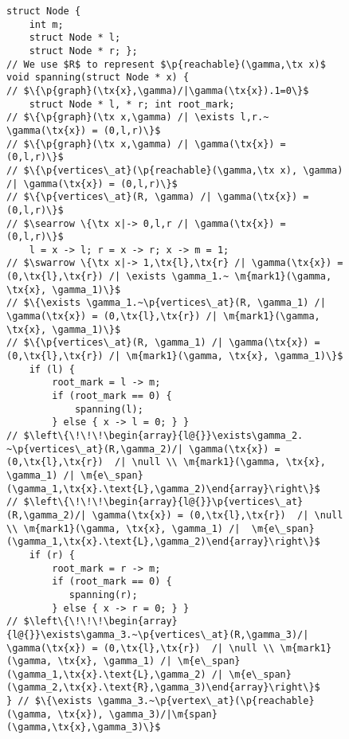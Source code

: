 \documentclass[acmsmall,review,anonymous]{acmart}\settopmatter{printfolios=true,printccs=false,printacmref=false}
\newcommand{\tx}[1]{\text{#1}}
\newcommand{\p}[1]{\ensuremath{\mathsf{#1}}} \newcommand{\m}[1]{\ensuremath{\mathit{#1}}} \newcommand{\ma}[1]{\ensuremath{\mathcal{#1}}} \let\ramify\lightning
\begin{document}
\begin{figure}[t]
  \begin{lstlisting}
struct Node {
    int m;
    struct Node * l;
    struct Node * r; };
// We use $R$ to represent $\p{reachable}(\gamma,\tx x)$
void spanning(struct Node * x) { 
// $\{\p{graph}(\tx{x},\gamma)/|\gamma(\tx{x}).1=0\}$ 
    struct Node * l, * r; int root_mark;
// $\{\p{graph}(\tx x,\gamma) /| \exists l,r.~ \gamma(\tx{x}) = (0,l,r)\}$
// $\{\p{graph}(\tx x,\gamma) /| \gamma(\tx{x}) = (0,l,r)\}$
// $\{\p{vertices\_at}(\p{reachable}(\gamma,\tx x), \gamma) /| \gamma(\tx{x}) = (0,l,r)\}$
// $\{\p{vertices\_at}(R, \gamma) /| \gamma(\tx{x}) = (0,l,r)\}$
// $\searrow \{\tx x|-> 0,l,r /| \gamma(\tx{x}) = (0,l,r)\}$
    l = x -> l; r = x -> r; x -> m = 1;
// $\swarrow \{\tx x|-> 1,\tx{l},\tx{r} /| \gamma(\tx{x}) = (0,\tx{l},\tx{r}) /| \exists \gamma_1.~ \m{mark1}(\gamma, \tx{x}, \gamma_1)\}$
// $\{\exists \gamma_1.~\p{vertices\_at}(R, \gamma_1) /| \gamma(\tx{x}) = (0,\tx{l},\tx{r}) /| \m{mark1}(\gamma, \tx{x}, \gamma_1)\}$
// $\{\p{vertices\_at}(R, \gamma_1) /| \gamma(\tx{x}) = (0,\tx{l},\tx{r}) /| \m{mark1}(\gamma, \tx{x}, \gamma_1)\}$
    if (l) {
        root_mark = l -> m;
        if (root_mark == 0) {
            spanning(l);
        } else { x -> l = 0; } }
// $\left\{\!\!\!\begin{array}{l@{}}\exists\gamma_2. ~\p{vertices\_at}(R,\gamma_2)/| \gamma(\tx{x}) = (0,\tx{l},\tx{r})  /| \null \\ \m{mark1}(\gamma, \tx{x}, \gamma_1) /| \m{e\_span}(\gamma_1,\tx{x}.\text{L},\gamma_2)\end{array}\right\}$
// $\left\{\!\!\!\begin{array}{l@{}}\p{vertices\_at}(R,\gamma_2)/| \gamma(\tx{x}) = (0,\tx{l},\tx{r})  /| \null \\ \m{mark1}(\gamma, \tx{x}, \gamma_1) /|  \m{e\_span}(\gamma_1,\tx{x}.\text{L},\gamma_2)\end{array}\right\}$
    if (r) {
        root_mark = r -> m;
        if (root_mark == 0) {
           spanning(r);
        } else { x -> r = 0; } }
// $\left\{\!\!\!\begin{array}{l@{}}\exists\gamma_3.~\p{vertices\_at}(R,\gamma_3)/| \gamma(\tx{x}) = (0,\tx{l},\tx{r})  /| \null \\ \m{mark1}(\gamma, \tx{x}, \gamma_1) /| \m{e\_span}(\gamma_1,\tx{x}.\text{L},\gamma_2) /| \m{e\_span}(\gamma_2,\tx{x}.\text{R},\gamma_3)\end{array}\right\}$
} // $\{\exists \gamma_3.~\p{vertex\_at}(\p{reachable}(\gamma, \tx{x}), \gamma_3)/|\m{span}(\gamma,\tx{x},\gamma_3)\}$

\end{lstlisting}
\end{figure}
\end{document}
